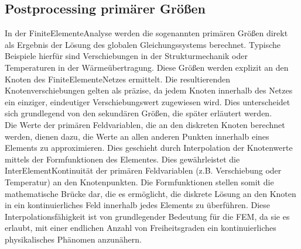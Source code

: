 \documentclass[letterpaper,10pt,german]{jupyterBook}
\begin{document}
\subsection{Postprocessing primärer Größen}
\label{\detokenize{chapters/chapter3/Postprocessing:postprocessing-primarer-groszen}}
\sphinxAtStartPar
In der Finite\sphinxhyphen{}Elemente\sphinxhyphen{}Analyse werden die sogenannten primären Größen direkt als Ergebnis der Lösung des globalen Gleichungssystems berechnet. Typische Beispiele hierfür sind Verschiebungen in der Strukturmechanik oder Temperaturen in der Wärmeübertragung. Diese Größen werden explizit an den Knoten des Finite\sphinxhyphen{}Elemente\sphinxhyphen{}Netzes ermittelt. Die resultierenden Knotenverschiebungen gelten als präzise, da jedem Knoten innerhalb des Netzes ein einziger, eindeutiger Verschiebungswert zugewiesen wird. Dies unterscheidet sich grundlegend von den sekundären Größen, die später erläutert werden.\\
Die Werte der primären Feldvariablen, die an den diskreten Knoten berechnet werden, dienen dazu, die Werte an allen anderen Punkten innerhalb eines Elements  zu approximieren. Dies geschieht durch Interpolation der Knotenwerte mittels der Formfunktionen des Elementes.
Dies gewährleistet die Inter\sphinxhyphen{}Element\sphinxhyphen{}Kontinuität der primären Feldvariablen (z.B. Verschiebung oder Temperatur) an den Knotenpunkten. Die Formfunktionen stellen somit die mathematische Brücke dar, die es ermöglicht, die diskrete Lösung an den Knoten in ein kontinuierliches Feld innerhalb jedes Elements zu überführen. Diese Interpolationsfähigkeit ist von grundlegender Bedeutung für die FEM, da sie es erlaubt, mit einer endlichen Anzahl von Freiheitsgraden ein kontinuierliches physikalisches Phänomen anzunähern.
\end{document}
